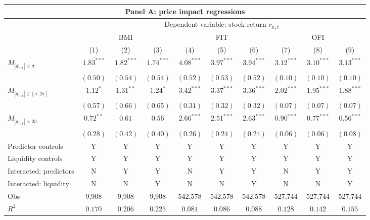\begin{tabular}{lccccccccc}
  \hline \multicolumn{10}{c}{Panel A: price impact regressions} \\
 \hline
                                    & \multicolumn{9}{c}{Dependent variable: stock return $r_{n,t}$} \\

                                    \cmidrule(l){2-10} & \multicolumn{3}{c}{BMI} & \multicolumn{3}{c}{FIT} & \multicolumn{3}{c}{OFI} \\
 \cmidrule(l){2-4} \cmidrule(l){5-7} \cmidrule(l){8-10} 
  & (1) & (2) & (3) & (4) & (5) & (6) & (7) & (8) & (9) \\ 
  $M_{|d_{n,t}| < \sigma}$ & $1.83^{***}$ & $1.82^{***}$ & $1.74^{***}$ & $4.08^{***}$ & $3.97^{***}$ & $3.94^{***}$ & $3.12^{***}$ & $3.10^{***}$ & $3.13^{***}$ \\ 
   & $(0.50)$ & $(0.54)$ & $(0.54)$ & $(0.52)$ & $(0.53)$ & $(0.52)$ & $(0.10)$ & $(0.10)$ & $(0.10)$ \\ 
  $M_{|d_{n,t}| \in [\sigma, 2\sigma]}$ & $1.12^{*}$ & $1.31^{**}$ & $1.24^{*}$ & $3.42^{***}$ & $3.37^{***}$ & $3.36^{***}$ & $2.02^{***}$ & $1.95^{***}$ & $1.88^{***}$ \\ 
   & $(0.57)$ & $(0.66)$ & $(0.65)$ & $(0.31)$ & $(0.32)$ & $(0.32)$ & $(0.07)$ & $(0.07)$ & $(0.07)$ \\ 
  $M_{|d_{n,t}| > 2 \sigma}$ & $0.72^{**}$ & $0.61$ & $0.56$ & $2.66^{***}$ & $2.51^{***}$ & $2.63^{***}$ & $0.90^{***}$ & $0.77^{***}$ & $0.56^{***}$ \\ 
   \vspace{5pt} & $(0.28)$ & $(0.42)$ & $(0.40)$ & $(0.26)$ & $(0.24)$ & $(0.24)$ & $(0.06)$ & $(0.06)$ & $(0.08)$ \\ 
  Predictor controls & Y & Y & Y & Y & Y & Y & Y & Y & Y \\ 
  Liquidity controls & Y & Y & Y & Y & Y & Y & Y & Y & Y \\ 
  Interacted: predictors & N & Y & Y & N & Y & Y & N & Y & Y \\ 
   \vspace{5pt}Interacted: liquidity & N & N & Y & N & N & Y & N & N & Y \\ 
  Obs & 9,908 & 9,908 & 9,908 & 542,578 & 542,578 & 542,578 & 527,744 & 527,744 & 527,744 \\ 
  $R^2$ & $0.170$ & $0.206$ & $0.225$ & $0.081$ & $0.086$ & $0.088$ & $0.128$ & $0.142$ & $0.155$ \\ 

\end{tabular}
